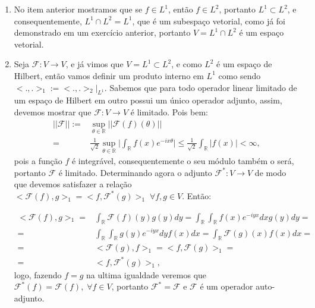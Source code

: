 \documentclass{article}
\begin{document}
\begin{enumerate}
\begin{enumerate}
				\item No item anterior mostramos que se $f \in L^{1}$, então $f \in L^{2}$, portanto $L^{1} \subset L^{2}$, e consequentemente, $L^{1} \cap L^{2} = L^{1}$, que é um subespaço vetorial, como já foi demonstrado em um exercício anterior, portanto $V= L^{1} \cap L^{2}$ é um espaço vetorial.
				
				\item Seja $\mathcal{F}:V \to V$, e já vimos que $V = L^{1} \subset L^{2}$, e como $L^{2}$ é um espaço de Hilbert, então vamos definir um produto interno em $L^{1}$ como sendo $<.,.>_{1} := <.,.>_{2}|_{L^{1}}$. Sabemos que para todo operador linear limitado de um espaço de Hilbert em outro possui um único operador adjunto, assim, devemos mostrar que $\mathcal{F}:V \to V$ é limitado. Pois bem:
				$$
				\begin{aligned}
				||\mathcal{F}|| 
				:= & \sup_{\theta \in \mathbb{R}}||\mathcal{F}(f)(\theta)||\\
				= & \frac{1}{\sqrt{2}}\sup_{\theta \in \mathbb{R}} \Big| \int_{\mathbb{R}}f(x)e^{-ix\theta} \Big| \leq \frac{1}{\sqrt{2}} \int_{\mathbb{R}}|f(x)| < \infty, 
				\end{aligned}
				$$
				pois a função $f$ é integrável, consequentemente o seu módulo também o será, portanto $\mathcal{F}$ é limitado. Determinando agora o adjunto $\mathcal{F}^{*} :  V \to V$ de modo que devemos satisfazer a relação $<\mathcal{F}(f), g>_{1} = <f, \mathcal{F}^{*}(g)>_{1}\; \forall f, g \in V$. Então:
				
				$$
				\begin{aligned}
				<\mathcal{F}(f), g>_{1} 
				= & \int_{\mathbb{R}} \mathcal{F}(f)(y)g(y)dy = \int_{\mathbb{R}} \int_{\mathbb{R}} f(x)e^{-iyx} dx g(y) dy = \\
				= & \int_{\mathbb{R}} \int_{\mathbb{R}}g(y)e^{-iyx}  dy f(x) dx = \int_{\mathbb{R}} \mathcal{F}(g)(x) f(x) dx = \\
				= & <\mathcal{F}(g), f>_{1} = <f, \mathcal{F}(g)>_{1} = \\
				= & <f, \mathcal{F}^{*}(g)>_{1},
				\end{aligned}
				$$
				logo, fazendo $f=g$ na ultima igualdade veremos que $\mathcal{F}^{*}(f) = \mathcal{F}(f), \; \forall f \in V$, portanto $\mathcal{F}^{*} = \mathcal{F}$ e $\mathcal{F}$ é um operador auto-adjunto.
				\end{enumerate}
		

\end{enumerate}
\end{document}
